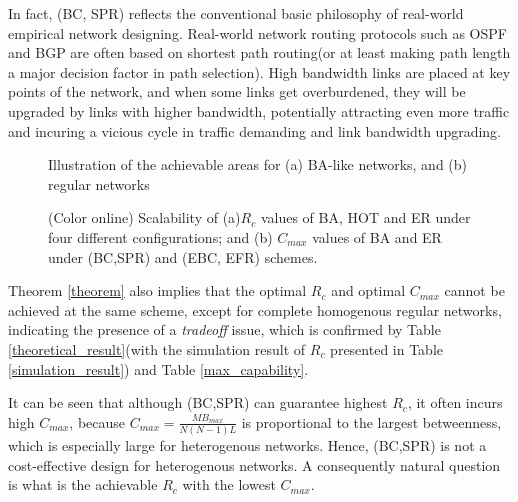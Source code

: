 \documentclass[journal]{IEEEtran}
\begin{document}
{In fact, (BC, SPR) reflects the conventional basic philosophy of
real-world empirical network designing. Real-world network routing
protocols such as OSPF and BGP are often based on shortest path
routing(or at least making path length a major decision factor in
path selection). High bandwidth links are placed at key points of
the network, and when some links get overburdened, they will be
upgraded by links with higher bandwidth, potentially attracting even
more traffic and incuring a vicious cycle in traffic demanding and
link bandwidth upgrading.

\begin{figure*}[!t]
 
\caption{Illustration of the achievable areas for (a) BA-like
networks, and (b) regular networks}
\label{design-space-illustration}
\end{figure*}





\begin{figure*}[!t]
\centering
 \caption{(Color online) Scalability of (a)$R_c$
values of BA, HOT and ER under four different configurations; and
(b) $C_{max}$ values of BA and ER under (BC,SPR) and (EBC, EFR)
schemes.} \label{evolvability}

\end{figure*}
Theorem \ref{theorem} also implies that the optimal $R_c$ and
optimal $C_{max}$ cannot be achieved at the same scheme, except for
complete homogenous regular networks, indicating the presence of a
\emph{tradeoff} issue, which is confirmed by Table
\ref{theoretical_result}(with the simulation result of $R_c$
presented in Table \ref{simulation_result}) and Table
\ref{max_capability}.

It can be seen that although (BC,SPR) can guarantee highest $R_c$,
it often incurs high $C_{max}$, because
$C_{max}=\frac{MB_{max}}{N(N-1)L}$ is proportional to the largest
betweenness, which is especially large for heterogenous networks.
Hence, (BC,SPR) is not a cost-effective design for heterogenous
networks. A consequently natural question is what is the achievable
$R_c$ with the lowest $C_{max}$.



}
\end{document}
